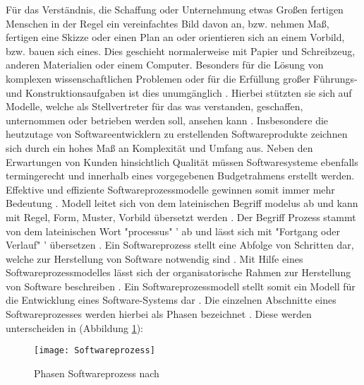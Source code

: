 Für das Verständnis, die Schaffung oder Unternehmung etwas Großen fertigen Menschen in der Regel ein vereinfachtes Bild davon an, bzw. nehmen Maß, fertigen eine Skizze oder einen Plan an oder orientieren sich an einem Vorbild, bzw. bauen sich eines. Dies geschieht normalerweise mit Papier und Schreibzeug, anderen Materialien oder einem Computer. Besonders für die Lösung von komplexen wissenschaftlichen Problemen oder für die Erfüllung großer Führungs- und Konstruktionsaufgaben ist dies unumgänglich \cite{Hesse2008}. \newline
Hierbei stützten sie sich auf Modelle, welche als Stellvertreter für das was verstanden, geschaffen, unternommen oder betrieben werden soll, ansehen kann \cite{Hesse2008}. \newline
Insbesondere die heutzutage von Softwareentwicklern zu erstellenden Softwareprodukte zeichnen sich durch ein hohes Maß an Komplexität und Umfang aus. Neben den Erwartungen von Kunden hinsichtlich Qualität müssen Softwaresysteme ebenfalls termingerecht und innerhalb eines vorgegebenen Budgetrahmens erstellt werden. Effektive und effiziente Softwareprozessmodelle gewinnen somit immer mehr Bedeutung \cite{Grechenig2010}.
Modell leitet sich von dem lateinischen Begriff  \glqq modelus \grqq
ab und kann mit  \glqq Regel, Form, Muster, Vorbild \grqq übersetzt werden \cite{Hesse2008}. 
Der Begriff Prozess stammt von dem lateinischen Wort "processus" ' ab und lässt sich mit "Fortgang oder Verlauf" ' übersetzen \cite{koch2011, Staud2006}. \newline 
Ein Softwareprozess stellt eine Abfolge von Schritten dar, welche zur Herstellung von Software notwendig sind \cite{Mishra2012, Stoerrle2005}. Mit Hilfe eines Softwareprozessmodelles lässt sich der organisatorische Rahmen zur Herstellung von Software beschreiben \cite{Koelmel2000}. Ein Softwareprozessmodell stellt somit ein Modell für die Entwicklung eines Software-Systems dar \cite{Hanser2010}. Die einzelnen Abschnitte eines Softwareprozesses werden hierbei als Phasen bezeichnet \cite{Stoerrle2005}. Diese werden unterscheiden in (Abbildung \ref{fig:SEProzess}):

\begin{figure}[htp]
\begin{center}
  \texttt{[image: Softwareprozess]} %
  \caption{Phasen Softwareprozess nach \cite{Hanser2010}}
  \label{fig:SEProzess}
\end{center}
\end{figure}


